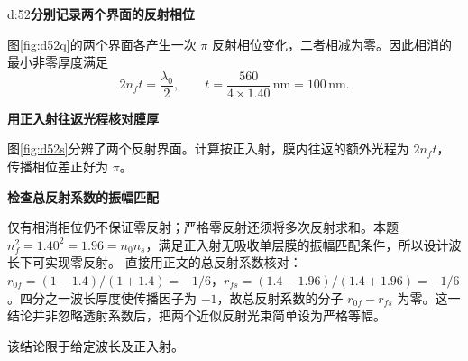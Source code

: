 \begin{drillsolution}{d:52}\textbf{分别记录两个界面的反射相位}\par\nobreak
图\ref{fig:d52q}的两个界面各产生一次 \(\pi\) 反射相位变化，二者相减为零。因此相消的最小非零厚度满足
\[
 2n_ft=\frac{\lambda_0}{2},\qquad
 \boxed{t=\frac{560}{4\times1.40}\,\mathrm{nm}=100\,\mathrm{nm}}.
\]


\par\medskip{}\noindent\textbf{用正入射往返光程核对膜厚}\par\nobreak
图\ref{fig:d52s}分辨了两个反射界面。计算按正入射，膜内往返的额外光程为 $2n_ft$，传播相位差正好为 $\pi$。


\par\medskip{}\noindent\textbf{检查总反射系数的振幅匹配}\par\nobreak
仅有相消相位仍不保证零反射；严格零反射还须将多次反射求和。本题
\(n_f^2=1.40^2=1.96=n_0n_s\)，满足正入射无吸收单层膜的振幅匹配条件，所以设计波长下可实现零反射。
直接用正文的总反射系数核对：$r_{0f}=(1-1.4)/(1+1.4)=-1/6$，$r_{fs}=(1.4-1.96)/(1.4+1.96)=-1/6$。四分之一波长厚度使传播因子为 $-1$，故总反射系数的分子 $r_{0f}-r_{fs}$ 为零。这一结论并非忽略透射系数后，把两个近似反射光束简单设为严格等幅。

该结论限于给定波长及正入射。
\end{drillsolution}

